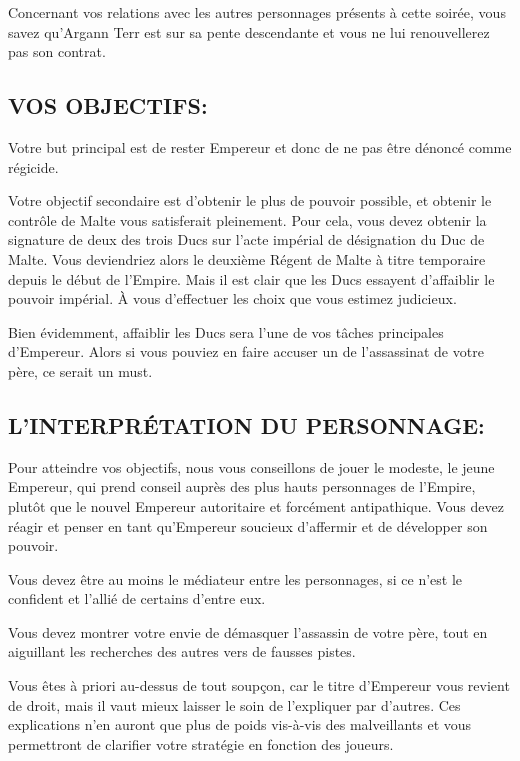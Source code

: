 \documentclass[14pt,twocolumn]{extarticle}
\begin{document}
Concernant vos relations avec les autres personnages présents à cette soirée,
vous savez qu'Argann Terr est sur sa pente descendante et vous ne lui
renouvellerez pas son contrat.

\subsection{VOS OBJECTIFS:}

Votre but principal est de rester Empereur et donc de ne pas être dénoncé
comme régicide.

Votre objectif secondaire est d'obtenir le plus de pouvoir possible, et obtenir
le contrôle de Malte vous satisferait pleinement. Pour cela, vous devez obtenir
la signature de deux des trois Ducs sur l'acte impérial de désignation du Duc
de Malte. Vous deviendriez alors le deuxième Régent de Malte à titre temporaire
depuis le début de l'Empire. Mais il est clair que les Ducs essayent
d'affaiblir le pouvoir impérial. À vous d'effectuer les choix que vous estimez
judicieux.

Bien évidemment, affaiblir les Ducs sera l'une de vos tâches principales
d'Empereur. Alors si vous pouviez en faire accuser un de l'assassinat de votre
père, ce serait un must.

\subsection{L'INTERPRÉTATION DU PERSONNAGE:}

Pour atteindre vos objectifs, nous vous conseillons de jouer le modeste, le
jeune Empereur, qui prend conseil auprès des plus hauts personnages de
l'Empire, plutôt que le nouvel Empereur autoritaire et forcément antipathique.
Vous devez réagir et penser en tant qu'Empereur soucieux d'affermir et de
développer son pouvoir.

Vous devez être au moins le médiateur entre les personnages, si ce n'est le
confident et l'allié de certains d'entre eux.

Vous devez montrer votre envie de démasquer l'assassin de votre père, tout en
aiguillant les recherches des autres vers de fausses pistes.

Vous êtes à priori au-dessus de tout soupçon, car le titre d'Empereur vous
revient de droit, mais il vaut mieux laisser le soin de l'expliquer par
d'autres. Ces explications n'en auront que plus de poids vis-à-vis des
malveillants et vous permettront de clarifier votre stratégie en fonction des
joueurs.
\end{document}
